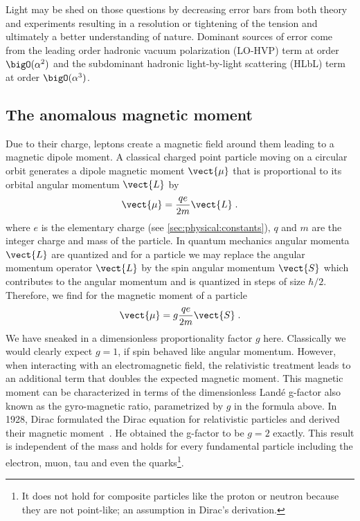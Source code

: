Light may be shed on those questions by decreasing error bars from both theory and experiments resulting in a resolution or tightening of the tension and ultimately a better understanding of nature.
Dominant sources of error come from the leading order hadronic vacuum polarization (LO-HVP) term at order $\bigO(\alpha^{2})$ and the subdominant hadronic light-by-light scattering (HLbL) term at order $\bigO(\alpha^{3})$.

\subsection{The anomalous magnetic moment}

Due to their charge, leptons create a magnetic field around them leading to a magnetic dipole moment.
A classical charged point particle moving on a circular orbit generates a dipole magnetic moment $\vect{\mu}$ that is proportional to its orbital angular momentum $\vect{L}$ by
\begin{equation}
\vect{\mu} = \frac{q e}{2 m} \vect{L} \;.
\end{equation}
where $e$ is the elementary charge (see \cref{sec:physical:constants}), $q$ and $m$ are the integer charge and mass of the particle.
In quantum mechanics angular momenta $\vect{L}$ are quantized and for a \spinhalf particle we may replace the angular momentum operator $\vect{L}$ by the spin angular momentum $\vect{S}$ which contributes to the angular momentum and is quantized in steps of size $\hbar/2$.
Therefore, we find for the magnetic moment of a \spinhalf particle
\begin{equation}
\vect{\mu} = g \frac{q e}{2 m} \vect{S} \;.
\end{equation}
We have sneaked in a dimensionless proportionality factor $g$ here.
Classically we would clearly expect $g=1$, if spin behaved like angular momentum.
However, when interacting with an electromagnetic field, the relativistic treatment leads to an additional term that doubles the expected magnetic moment.
This magnetic moment can be characterized in terms of the dimensionless Landé g-factor also known as the gyro-magnetic ratio, parametrized by $g$ in the formula above.
In 1928, Dirac formulated the Dirac equation for relativistic \spinhalf particles and derived their magnetic moment~\cite{dirac1928quantum}.
He obtained the g-factor to be $g=2$ exactly.
This result is independent of the mass and holds for every fundamental \spinhalf particle including the electron, muon, tau and even the quarks\footnote{It does not hold for composite \spinhalf particles like the proton or neutron because they are not point-like; an assumption in Dirac's derivation.}.
